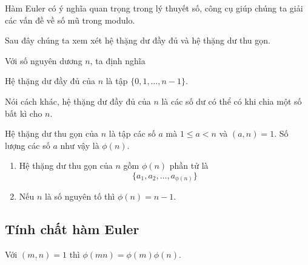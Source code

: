 \documentclass{mynotes}
\begin{document}
Hàm Euler có ý nghĩa quan trọng trong lý thuyết số, công cụ giúp chúng ta giải các vấn đề về số mũ trong modulo.

Sau đây chúng ta xem xét hệ thặng dư đầy đủ và hệ thặng dư thu gọn.

Với số nguyên dương $n$, ta định nghĩa

\begin{definition}
    Hệ thặng dư đầy đủ của $n$ là tập $\{0, 1, \ldots, n-1\}$.
\end{definition}

Nói cách khác, hệ thặng dư đầy đủ của $n$ là các số dư có thể có khi chia một số bất kì cho $n$.

\begin{definition}
    Hệ thặng dư thu gọn của $n$ là tập các số $a$ mà $1 \leqslant a < n$ và $(a, n) = 1$. Số lượng các số $a$ như vậy là $\phi (n)$.  
\end{definition}

\begin{remark}
    \begin{enumerate}
        \item Hệ thặng dư thu gọn của $n$ gồm $\phi(n)$ phần tử là \[ \{a_1, a_2, \ldots, a_{\phi(n)}\} \]
        \item Nếu $n$ là số nguyên tố thì $\phi(n) = n-1$.
    \end{enumerate}
\end{remark}

\subsection*{Tính chất hàm Euler}

\begin{remark}
    Với $(m, n) = 1$ thì $\phi(m n) = \phi(m) \phi(n)$.
\end{remark}
\end{document}
